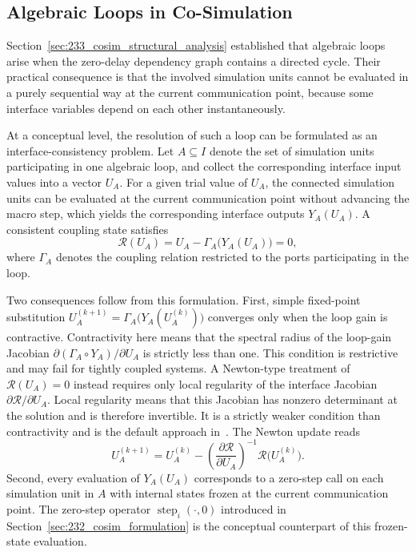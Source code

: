 \subsection{Algebraic Loops in Co-Simulation}
\label{sec:235_cosim_algebraic_loops}

Section~\ref{sec:233_cosim_structural_analysis} established that algebraic loops arise when the zero-delay dependency graph contains a directed cycle.
Their practical consequence is that the involved simulation units cannot be evaluated in a purely sequential way at the current communication point, because some interface variables depend on each other instantaneously.

At a conceptual level, the resolution of such a loop can be formulated as an interface-consistency problem.
Let $A \subseteq I$ denote the set of simulation units participating in one algebraic loop, and collect the corresponding interface input values into a vector $U_A$.
For a given trial value of $U_A$, the connected simulation units can be evaluated at the current communication point without advancing the macro step, which yields the corresponding interface outputs $Y_A(U_A)$.
A consistent coupling state satisfies
\begin{equation}
    \mathcal{R}(U_A) = U_A - \Gamma_A\!\bigl(Y_A(U_A)\bigr) = 0,
\end{equation}
where $\Gamma_A$ denotes the coupling relation restricted to the ports participating in the loop.

Two consequences follow from this formulation.
First, simple fixed-point substitution $U_A^{(k+1)}=\Gamma_A\!\bigl(Y_A(U_A^{(k)})\bigr)$ converges only when the loop gain is contractive.
Contractivity here means that the spectral radius of the loop-gain Jacobian $\partial(\Gamma_A\!\circ\!Y_A)/\partial U_A$ is strictly less than one.
This condition is restrictive and may fail for tightly coupled systems.
A Newton-type treatment of $\mathcal{R}(U_A)=0$ instead requires only local regularity of the interface Jacobian $\partial\mathcal{R}/\partial U_A$.
Local regularity means that this Jacobian has nonzero determinant at the solution and is therefore invertible.
It is a strictly weaker condition than contractivity and is the default approach in~\cite{sicklinger_interface_2014}.
The Newton update reads
\begin{equation}
    U_A^{(k+1)} = U_A^{(k)} - \left(\frac{\partial\mathcal{R}}{\partial U_A}\right)^{-1}\!\mathcal{R}\!\bigl(U_A^{(k)}\bigr).
    \label{eq:cosim_interface_newton}
\end{equation}
Second, every evaluation of $Y_A(U_A)$ corresponds to a zero-step call on each simulation unit in $A$ with internal states frozen at the current communication point.
The zero-step operator $\operatorname{step}_i(\cdot,0)$ introduced in Section~\ref{sec:232_cosim_formulation} is the conceptual counterpart of this frozen-state evaluation.

